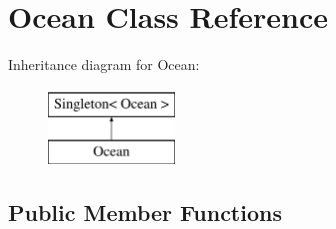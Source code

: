 \hypertarget{classOcean}{
\section{Ocean Class Reference}
\label{classOcean}
}
Inheritance diagram for Ocean:\begin{figure}[H]
\begin{center}
\leavevmode
\includegraphics[height=2cm]{classOcean}
\end{center}
\end{figure}
\subsection*{Public Member Functions}
